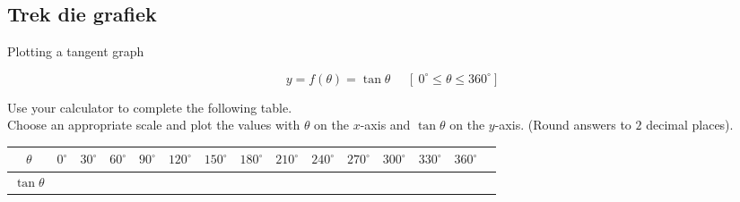 \subsection*{Trek die grafiek}
\begin{wex}
{Plotting a tangent graph}
{
\begin{equation*}
 y=f(\theta)=\tan  \theta~~~~~~[~0^{\circ} \leq \theta \leq 360^{\circ}]
\end{equation*}

Use your calculator to complete the following table. \\
Choose an appropriate scale and plot the values with $\theta $ on the $x$-axis and $\tan\theta$ on the $y$-axis. (Round answers to $2$ decimal places). 

\begin{table}[H]
\begin{tabular}{|c|m{0.4cm}|m{0.4cm}|m{0.4cm}|m{0.4cm}|m{0.5cm}|m{0.5cm}|m{0.5cm}|m{0.5cm}|m{0.5cm}|m{0.5cm}|m{0.5cm}|m{0.5cm}|m{0.5cm}|} \hline

\footnotesize$\theta $&
\footnotesize$0^{\circ }$&
\footnotesize$30^{\circ }$&
\footnotesize$60^{\circ }$&
\footnotesize$90^{\circ }$&
\footnotesize$120^{\circ }$&
\footnotesize$150^{\circ }$&
\footnotesize$180^{\circ }$&
\footnotesize$210^{\circ }$&
\footnotesize$240^{\circ }$&
\footnotesize$270^{\circ }$&
\footnotesize$300^{\circ }$&
\footnotesize$330^{\circ }$&
\footnotesize$360^{\circ }$
\\ \hline

\footnotesize$\tan\theta $&
&
&
&
&
&
&
&
&
&
&
&
&
&

 \hline
\end{tabular}


\end{table}}
\end{wex}
